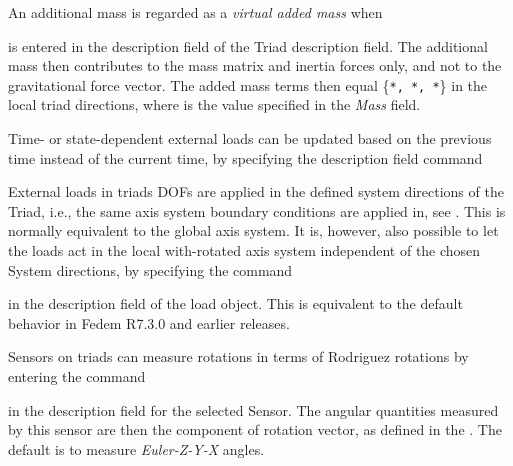 An additional mass is regarded as a {\sl virtual added mass} when


\noindent
is entered in the description field of the Triad description field.
The additional mass then contributes to the mass matrix and inertia forces only,
and not to the gravitational force vector. The added mass terms then equal
\{{\tt{}*, *,
*}\} in the local triad directions,
where {\tt{}} is the value specified in the {\sl Mass} field.



Time- or state-dependent external loads can be updated based on the previous
time instead of the current time, by specifying the description field command


External loads in triads DOFs are applied in the defined system directions
of the Triad, i.e., the same axis system boundary conditions are applied in,
see .
This is normally equivalent to the global axis system. It is, however,
also possible to let the loads act in the local with-rotated axis system
independent of the chosen System directions, by specifying the command


\noindent
in the description field of the load object. This is equivalent to the
default behavior in Fedem R7.3.0 and earlier releases.




Sensors on triads can measure rotations in terms of Rodriguez rotations
by entering the command


\noindent
in the description field for the selected Sensor. The angular quantities
measured by this sensor are then the component of rotation vector, as defined in
the .
The default is to measure {\sl Euler-Z-Y-X} angles.

